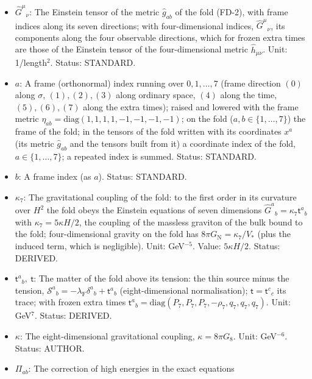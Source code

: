 \documentclass[
  10pt,
]{article}
\providecommand{\tightlist}{%
  \setlength{\itemsep}{0pt}\setlength{\parskip}{0pt}}
\begin{document}
\begin{itemize}
\tightlist
\item
  \(\hat G^\mu{}_\nu\): The Einstein tensor of the metric
  \(\hat g_{ab}\) of the fold (FD-2), with frame indices along its seven
  directions; with four-dimensional indices, \(\hat G^\mu{}_\nu\), its
  components along the four observable directions, which for frozen
  extra times are those of the Einstein tensor of the four-dimensional
  metric \(\hat h_{\mu\nu}\). Unit: 1/length\(^2\). Status: STANDARD.
\item
  \(a\): A frame (orthonormal) index running over \(0, 1, \dots, 7\)
  (frame direction \((0)\) along \(\sigma\), \((1), (2), (3)\) along
  ordinary space, \((4)\) along the time, \((5), (6), (7)\) along the
  extra times); raised and lowered with the frame metric
  \(\eta_{ab} = \mathrm{diag}(1, 1, 1, 1, -1, -1, -1, -1)\); on the fold
  (\(a, b \in \{1, \dots, 7\}\)) the frame of the fold; in the tensors
  of the fold written with its coordinates \(x^a\) (its metric
  \(\hat g_{ab}\) and the tensors built from it) a coordinate index of
  the fold, \(a \in \{1, \dots, 7\}\); a repeated index is summed.
  Status: STANDARD.
\item
  \(b\): A frame index (as \(a\)). Status: STANDARD.
\item
  \(\kappa_7\): The gravitational coupling of the fold: to the first
  order in its curvature over \(H^2\) the fold obeys the Einstein
  equations of seven dimensions
  \(\hat G^a{}_b = \kappa_7\mathsf{t}^a{}_b\) with
  \(\kappa_7 = 5\kappa H/2\), the coupling of the massless graviton of
  the bulk bound to the fold; four-dimensional gravity on the fold has
  \(8\pi G_{\mathrm{N}} = \kappa_7/V_*\) (plus the induced term, which
  is negligible). Unit: GeV\(^{-5}\). Value: \(5\kappa H/2\). Status:
  DERIVED.
\item
  \(\mathsf{t}^a{}_b,\ \mathsf{t}\): The matter of the fold above its
  tension: the thin source minus the tension,
  \(\mathcal{S}^a{}_b = -\lambda_{\mathrm{F}}\delta^a{}_b + \mathsf{t}^a{}_b\)
  (eight-dimensional normalisation); \(\mathsf{t} = \mathsf{t}^c{}_c\)
  its trace; with frozen extra times
  \(\mathsf{t}^a{}_b = \mathrm{diag}(P_7, P_7, P_7, -\rho_7, q_7, q_7, q_7)\).
  Unit: GeV\(^7\). Status: DERIVED.
\item
  \(\kappa\): The eight-dimensional gravitational coupling,
  \(\kappa = 8\pi G_8\). Unit: GeV\(^{-6}\). Status: AUTHOR.
\item
  \(\Pi_{ab}\): The correction of high energies in the exact equations

\end{itemize}
\end{document}
